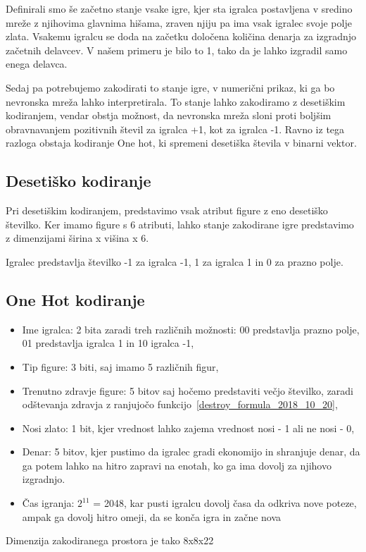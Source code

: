 \documentclass[a4paper, 12pt]{book}
\begin{document}
Definirali smo še začetno stanje vsake igre, kjer sta igralca postavljena v sredino mreže z njihovima glavnima hišama, zraven njiju pa ima vsak igralec svoje polje zlata. Vsakemu igralcu se doda na začetku določena količina denarja za izgradnjo začetnih delavcev. V našem primeru je bilo to 1, tako da je lahko izgradil samo enega delavca.

Sedaj pa potrebujemo zakodirati to stanje igre, v numerični prikaz, ki ga bo nevronska mreža lahko interpretirala. To stanje lahko zakodiramo z desetiškim kodiranjem, vendar obstja možnost, da nevronska mreža sloni proti boljšim obravnavanjem pozitivnih števil za igralca +1, kot za igralca -1. Ravno iz tega razloga obstaja kodiranje One hot, ki spremeni desetiška števila v binarni vektor.

\subsection{Desetiško kodiranje}
Pri desetiškim kodiranjem, predstavimo vsak atribut figure z eno desetiško številko.
Ker imamo figure s 6 atributi, lahko stanje zakodirane igre predstavimo z dimenzijami širina x višina x 6.

Igralec predstavlja številko -1 za igralca -1, 1 za igralca 1 in 0 za prazno polje.
\subsection{One Hot kodiranje}
\begin{itemize}
	\item Ime igralca: 2 bita zaradi treh različnih možnosti: 00 predstavlja prazno polje, 01 predstavlja igralca 1 in 10 igralca -1,
	\item Tip figure: 3 biti, saj imamo 5 različnih figur,
	\item Trenutno zdravje figure: 5 bitov saj hočemo predstaviti večjo številko, zaradi odštevanja zdravja z ranjujočo funkcijo~\ref{destroy_formula_2018_10_20},
	\item Nosi zlato: 1 bit, kjer vrednost lahko zajema vrednost nosi - 1 ali ne nosi - 0,
	\item Denar: 5 bitov, kjer pustimo da igralec gradi ekonomijo in shranjuje denar, da ga potem lahko na hitro zapravi na enotah, ko ga ima dovolj za njihovo izgradnjo.
	\item Čas igranja: $2^{11}$ = 2048, kar pusti igralcu dovolj časa da odkriva nove poteze, ampak ga dovolj hitro omeji, da se konča igra in začne nova
\end{itemize}
Dimenzija zakodiranega prostora je tako 8x8x22
\end{document}
